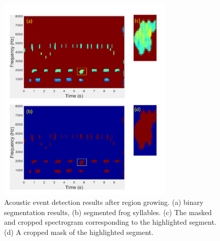 
\begin{figure}[htb!]
\centering
\includegraphics[width=0.75\textwidth]{image/Ch6/contentShape.pdf}
\caption[Acoustic event detection results after region growing]{Acoustic event detection results after region growing. (a) binary segmentation results, (b) segmented frog syllables. (c) The masked and cropped spectrogram corresponding to the highlighted segment. (d) A cropped mask of the highlighted segment.}
\label{fig:Ch6_AED}
\end{figure}






